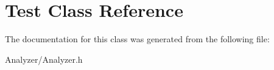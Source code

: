 \hypertarget{class_test}{\section{Test Class Reference}
\label{class_test}
}


The documentation for this class was generated from the following file\-:\begin{DoxyCompactItemize}
\item 
Analyzer/Analyzer.\-h\end{DoxyCompactItemize}

